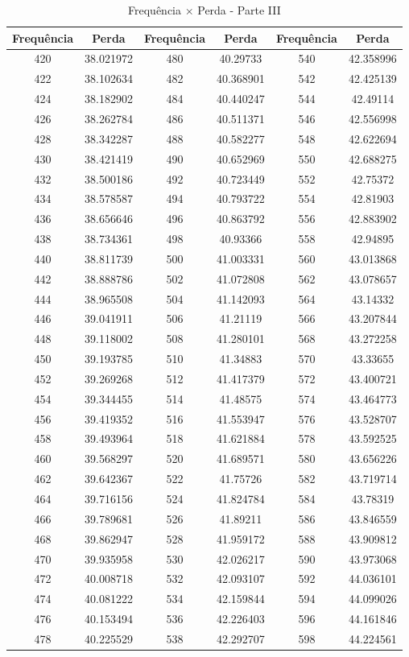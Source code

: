 \documentclass[
	12pt,				%
	openright,			%
	twoside,			%
	a4paper,			%
	english,			%
	french,				%
	spanish,			%
	brazil,				%
	]{abntex2}
\begin{document}
\begin{apendicesenv}
\newpage
\begin{table}[H]

\caption{Frequência  $\times$ Perda - Parte III \label{tab:p_f_iii}}
\centering
\begin{tabular}{c c| c c | c c}
Frequência & Perda & Frequência & Perda & Frequência & Perda \\
\hline
420 & 38.021972 & 480 & 40.29733 & 540 & 42.358996\\
422 & 38.102634 & 482 & 40.368901 & 542 & 42.425139\\
424 & 38.182902 & 484 & 40.440247 & 544 & 42.49114\\
426 & 38.262784 & 486 & 40.511371 & 546 & 42.556998\\
428 & 38.342287 & 488 & 40.582277 & 548 & 42.622694\\
430 & 38.421419 & 490 & 40.652969 & 550 & 42.688275\\
432 & 38.500186 & 492 & 40.723449 & 552 & 42.75372\\
434 & 38.578587 & 494 & 40.793722 & 554 & 42.81903\\
436 & 38.656646 & 496 & 40.863792 & 556 & 42.883902\\
438 & 38.734361 & 498 & 40.93366 & 558 & 42.94895\\
440 & 38.811739 & 500 & 41.003331 & 560 & 43.013868\\
442 & 38.888786 & 502 & 41.072808 & 562 & 43.078657\\
444 & 38.965508 & 504 & 41.142093 & 564 & 43.14332\\
446 & 39.041911 & 506 & 41.21119 & 566 & 43.207844\\
448 & 39.118002 & 508 & 41.280101 & 568 & 43.272258\\
450 & 39.193785 & 510 & 41.34883 & 570 & 43.33655\\
452 & 39.269268 & 512 & 41.417379 & 572 & 43.400721\\
454 & 39.344455 & 514 & 41.48575 & 574 & 43.464773\\
456 & 39.419352 & 516 & 41.553947 & 576 & 43.528707\\
458 & 39.493964 & 518 & 41.621884 & 578 & 43.592525\\
460 & 39.568297 & 520 & 41.689571 & 580 & 43.656226\\
462 & 39.642367 & 522 & 41.75726 & 582 & 43.719714\\
464 & 39.716156 & 524 & 41.824784 & 584 & 43.78319\\
466 & 39.789681 & 526 & 41.89211 & 586 & 43.846559\\
468 & 39.862947 & 528 & 41.959172 & 588 & 43.909812\\
470 & 39.935958 & 530 & 42.026217 & 590 & 43.973068\\
472 & 40.008718 & 532 & 42.093107 & 592 & 44.036101\\
474 & 40.081222 & 534 & 42.159844 & 594 & 44.099026\\
476 & 40.153494 & 536 & 42.226403 & 596 & 44.161846\\
478 & 40.225529 & 538 & 42.292707 & 598 & 44.224561\\
\end{tabular}
\end{table}


\end{apendicesenv}
\end{document}
